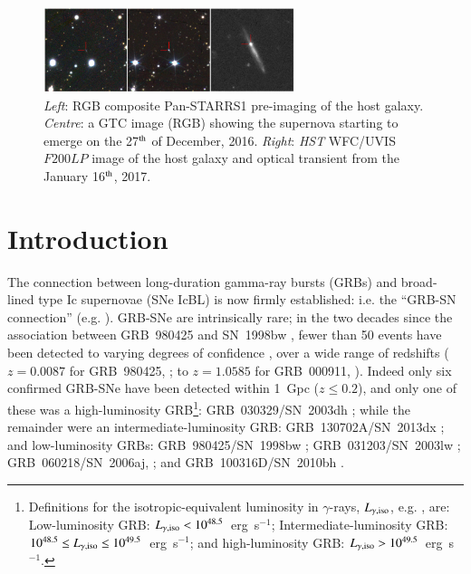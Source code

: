 \documentclass[traditabstract,longauth]{aa}
\begin{document}
\begin{figure}
   \centering %
   \includegraphics[width=\hsize ]{Fig1_panstarrs_GTC_HST-eps-converted-to.pdf}
     \caption{\textit{Left}: RGB composite Pan-STARRS1 pre-imaging of the host galaxy. \textit{Centre}: a GTC image (RGB) showing the supernova starting to emerge on the 27$^{\rm th}$ of December, 2016. \textit{Right}: \emph{HST} WFC/UVIS $F200LP$ image of the host galaxy and optical transient from the January 16$^{\rm th}$, 2017.}
         \label{FigFC}
\end{figure}





\section{Introduction}
The connection between long-duration gamma-ray bursts (GRBs) and broad-lined type Ic supernovae (SNe IcBL) is now firmly established: i.e. the ``GRB-SN connection'' (e.g. \citealt{WoosleyBloom06,Cano2016}).  GRB-SNe are intrinsically rare; in the two decades since the association between GRB~980425 and SN~1998bw \citep{Galama98,Patat01}, fewer than 50 events have been detected \citep{Cano2016} to varying degrees of confidence \citep{HjorthBloom12}, over a wide range of redshifts ($z = 0.0087$ for GRB~980425, \citealt{LHW14}; to $z = 1.0585$ for GRB~000911, \citealt{Price02}).  Indeed only six confirmed GRB-SNe have been detected within 1~Gpc ($z \le 0.2$), and only one of these was a high-luminosity GRB\footnote{Definitions for the isotropic-equivalent luminosity in $\gamma$-rays, $L_{\gamma,\rm iso}$, e.g. \citet{Bromberg11,Hjorth13,Cano2016}, are: Low-luminosity GRB: $L_{\rm \gamma,iso} < 10^{48.5}$~erg~s$^{-1}$; Intermediate-luminosity GRB: $10^{48.5} \leq L_{\rm \gamma,iso} \leq 10^{49.5}$~erg~s$^{-1}$; and high-luminosity GRB: $L_{\rm \gamma,iso} > 10^{49.5}$~erg~s$^{-1}$.}: GRB~030329/SN~2003dh \citep{Hjorth03,Stanek03,Matheson03}; while the remainder were an intermediate-luminosity GRB: GRB~130702A/SN~2013dx \citep{Delia15,Toy16}; and low-luminosity GRBs: GRB~980425/SN~1998bw \citep{Galama98,Patat01};  GRB~031203/SN~2003lw \citep{Malesani04}; GRB~060218/SN~2006aj, \citep{Pian06,Mazzali06}; and GRB~100316D/SN~2010bh \citep{Cano2011b,Bufano12,Olivares12}.
\end{document}
